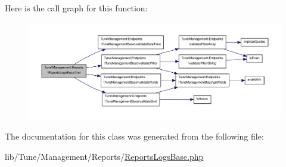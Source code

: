 Here is the call graph for this function\-:
\nopagebreak
\begin{figure}[H]
\begin{center}
\leavevmode
\includegraphics[width=350pt]{classTune_1_1Management_1_1Reports_1_1ReportsLogsBase_aa9efe4c209d9869a8da68f19a265dfb8_cgraph}
\end{center}
\end{figure}




The documentation for this class was generated from the following file\-:\begin{DoxyCompactItemize}
\item 
lib/\-Tune/\-Management/\-Reports/\hyperlink{ReportsLogsBase_8php}{Reports\-Logs\-Base.\-php}\end{DoxyCompactItemize}
